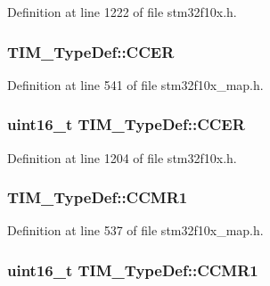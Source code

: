 Definition at line 1222 of file stm32f10x.\+h.

\subsubsection[{\texorpdfstring{C\+C\+ER}{CCER}}]{ T\+I\+M\+\_\+\+Type\+Def\+::\+C\+C\+ER}\hypertarget{struct_t_i_m___type_def_a12aec3934b9abd3f1a8988c6930d7473}{}\label{struct_t_i_m___type_def_a12aec3934b9abd3f1a8988c6930d7473}


Definition at line 541 of file stm32f10x\+\_\+map.\+h.

\subsubsection[{\texorpdfstring{C\+C\+ER}{CCER}}]{ {\bf uint16\+\_\+t} T\+I\+M\+\_\+\+Type\+Def\+::\+C\+C\+ER}\hypertarget{struct_t_i_m___type_def_a2a7ebf9d3041dc20da591668d916f5bc}{}\label{struct_t_i_m___type_def_a2a7ebf9d3041dc20da591668d916f5bc}


Definition at line 1204 of file stm32f10x.\+h.

\subsubsection[{\texorpdfstring{C\+C\+M\+R1}{CCMR1}}]{ T\+I\+M\+\_\+\+Type\+Def\+::\+C\+C\+M\+R1}\hypertarget{struct_t_i_m___type_def_ad0588252dd82c3f5b640b38ee342b420}{}\label{struct_t_i_m___type_def_ad0588252dd82c3f5b640b38ee342b420}


Definition at line 537 of file stm32f10x\+\_\+map.\+h.

\subsubsection[{\texorpdfstring{C\+C\+M\+R1}{CCMR1}}]{ {\bf uint16\+\_\+t} T\+I\+M\+\_\+\+Type\+Def\+::\+C\+C\+M\+R1}\hypertarget{struct_t_i_m___type_def_a9094f9bb312461d2fc1499f5f8d91c64}{}\label{struct_t_i_m___type_def_a9094f9bb312461d2fc1499f5f8d91c64}


